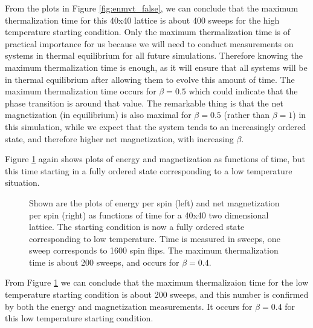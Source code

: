 \documentclass[11pt,a4paper]{article}
\begin{document}
From the plots in Figure \ref{fig:enmvt_false}, we can conclude that the maximum thermalization time for this 40x40 lattice is about 400 sweeps for the high temperature starting condition. Only the maximum thermalization time is of practical importance for us because we will need to
 conduct measurements on systems in thermal equilibrium for all future simulations. Therefore knowing the maximum thermalization time is
 enough, as it will ensure that all systems will be in thermal equilibrium after allowing them to evolve this amount of time. The maximum 
 thermalization time occurs for $\beta = 0.5$ which could indicate that the phase transition is around that value. The remarkable thing
 is that the net magnetization (in equilibrium) is also maximal for $\beta = 0.5$ (rather than $\beta = 1$) in this simulation, while we
 expect that the system tends to an increasingly ordered state, and therefore higher net magnetization, with increasing $\beta$. 



\pagebreak

Figure \ref{fig:enmvt_true} again shows plots of energy and magnetization as functions of time, but this time starting in a fully ordered
 state corresponding to a low temperature situation. 


\begin{figure}[h!]

  \caption{Shown are the plots of energy per spin (left) and net magnetization per spin (right) as functions of time
    for a 40x40 two dimensional lattice. The starting condition is now a fully
    ordered state corresponding to low temperature. Time is measured in sweeps, one sweep corresponds to 1600 spin
    flips. The maximum thermalization time is about 200 sweeps, and occurs for $\beta = 0.4$.}

\label{fig:enmvt_true}
\end{figure}

From Figure \ref{fig:enmvt_true} we can conclude that the maximum thermalizaion time for the low temperature starting condition is about
 200 sweeps, and this number is confirmed by both the energy and magnetization measurements. It occurs for $\beta = 0.4$ for this low 
 temperature starting condition. 

\end{document}
